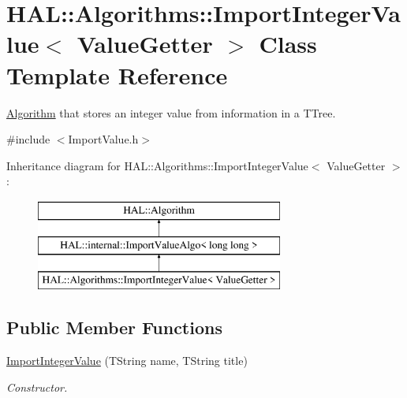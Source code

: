 \hypertarget{class_h_a_l_1_1_algorithms_1_1_import_integer_value}{\section{H\+A\+L\+:\+:Algorithms\+:\+:Import\+Integer\+Value$<$ Value\+Getter $>$ Class Template Reference}
\label{class_h_a_l_1_1_algorithms_1_1_import_integer_value}
}


\hyperlink{class_h_a_l_1_1_algorithm}{Algorithm} that stores an integer value from information in a T\+Tree.  




{\ttfamily \#include $<$Import\+Value.\+h$>$}

Inheritance diagram for H\+A\+L\+:\+:Algorithms\+:\+:Import\+Integer\+Value$<$ Value\+Getter $>$\+:\begin{figure}[H]
\begin{center}
\leavevmode
\includegraphics[height=3.000000cm]{class_h_a_l_1_1_algorithms_1_1_import_integer_value}
\end{center}
\end{figure}
\subsection*{Public Member Functions}
\begin{DoxyCompactItemize}
\item 
\hyperlink{class_h_a_l_1_1_algorithms_1_1_import_integer_value_a19a3f6712ad9a986d98c6da3a9b196ec}{Import\+Integer\+Value} (T\+String name, T\+String title)
\begin{DoxyCompactList}\small\item\em Constructor. \end{DoxyCompactList}\end{DoxyCompactItemize}
